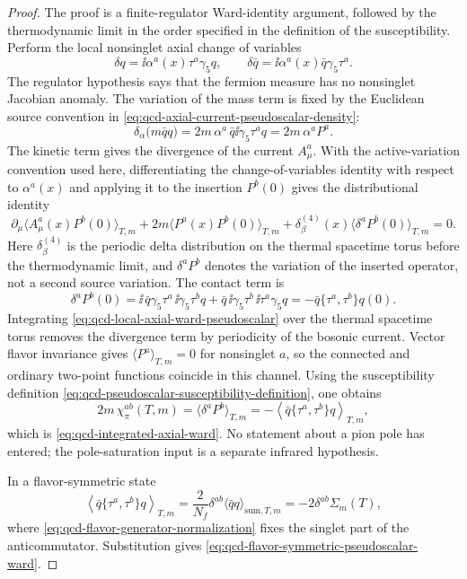 \begin{proof}
The proof is a finite-regulator Ward-identity argument, followed by the
thermodynamic limit in the order specified in the definition of the
susceptibility.  Perform the local nonsinglet axial change of variables
\[
  \delta q=\ii\alpha^a(x)\tau^a\gamma_5 q,\qquad
  \delta\bar q=\ii\alpha^a(x)\bar q\gamma_5\tau^a .
\]
The regulator hypothesis says that the fermion measure has no nonsinglet
Jacobian anomaly.  The variation of the mass term is fixed by the Euclidean
source convention in \eqref{eq:qcd-axial-current-pseudoscalar-density}:
\[
  \delta_\alpha\bigl(m\bar q q\bigr)
  =
  2m\,\alpha^a\,\bar q\ii\gamma_5\tau^a q
  =
  2m\,\alpha^a P^a .
\]
The kinetic term gives the divergence of the current \(A_\mu^a\).  With the
active-variation convention used here, differentiating the change-of-variables
identity with respect to \(\alpha^a(x)\) and applying it to the insertion
\(P^b(0)\) gives the distributional identity
\begin{equation}
  \partial_\mu
  \langle A_\mu^a(x)P^b(0)\rangle_{T,m}
  +2m\langle P^a(x)P^b(0)\rangle_{T,m}
  +\delta^{(4)}_\beta(x)
  \langle \delta^a P^b(0)\rangle_{T,m}
  =
  0 .
  \label{eq:qcd-local-axial-ward-pseudoscalar}
\end{equation}
Here \(\delta^{(4)}_\beta\) is the periodic delta distribution on the thermal
spacetime torus before the thermodynamic limit, and
\(\delta^aP^b\) denotes the variation of the inserted operator, not a second
source variation.  The contact term is
\[
  \delta^a P^b(0)
  =
  \ii\,\bar q\gamma_5\tau^a\,\ii\gamma_5\tau^b q
  +
  \bar q\,\ii\gamma_5\tau^b\,\ii\tau^a\gamma_5 q
  =
  -\bar q\{\tau^a,\tau^b\}q(0).
\]
Integrating \eqref{eq:qcd-local-axial-ward-pseudoscalar} over the thermal
spacetime torus removes the divergence term by periodicity of the bosonic
current.  Vector flavor invariance gives \(\langle P^a\rangle_{T,m}=0\) for
nonsinglet \(a\), so the connected and ordinary two-point functions coincide
in this channel.  Using the susceptibility definition
\eqref{eq:qcd-pseudoscalar-susceptibility-definition}, one obtains
\[
  2m\,\chi_\pi^{ab}(T,m)
  =
  \langle\delta^a P^b\rangle_{T,m}
  =
  -
  \left\langle
    \bar q\{\tau^a,\tau^b\}q
  \right\rangle_{T,m},
\]
which is \eqref{eq:qcd-integrated-axial-ward}.  No statement about a pion pole
has entered; the pole-saturation input is a separate infrared hypothesis.

In a flavor-symmetric state
\[
  \left\langle\bar q\{\tau^a,\tau^b\}q\right\rangle_{T,m}
  =
  \frac{2}{N_f}\delta^{ab}
  \langle\bar q q\rangle_{\mathrm{sum},T,m}
  =
  -2\delta^{ab}\Sigma_m(T),
\]
where \eqref{eq:qcd-flavor-generator-normalization} fixes the singlet part of
the anticommutator.  Substitution gives
\eqref{eq:qcd-flavor-symmetric-pseudoscalar-ward}.
\end{proof}

